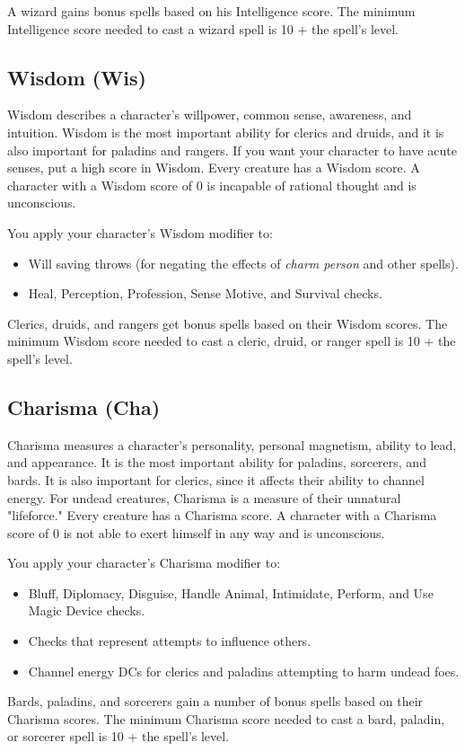A wizard gains bonus spells based on his Intelligence score. The minimum Intelligence score needed to cast a wizard spell is 10 + the spell's level. 
				
\subsection{Wisdom (Wis)}

				
Wisdom describes a character's willpower, common sense, awareness, and intuition. Wisdom is the most important ability for clerics and druids, and it is also important for paladins and rangers. If you want your character to have acute senses, put a high score in Wisdom. Every creature has a Wisdom score. A character with a Wisdom score of 0 is incapable of rational thought and is unconscious.
				
You apply your character's Wisdom modifier to:
				\begin{itemize}\item  Will saving throws (for negating the effects of \textit{charm person} and other spells).
				\item  Heal, Perception, Profession, Sense Motive, and Survival checks.
\end{itemize}
				
Clerics, druids, and rangers get bonus spells based on their Wisdom scores. The minimum Wisdom score needed to cast a cleric, druid, or ranger spell is 10 + the spell's level.
				
\subsection{Charisma (Cha)}

				
Charisma measures a character's personality, personal magnetism, ability to lead, and appearance. It is the most important ability for paladins, sorcerers, and bards. It is also important for clerics, since it affects their ability to channel energy. For undead creatures, Charisma is a measure of their unnatural "lifeforce." Every creature has a Charisma score. A character with a Charisma score of 0 is not able to exert himself in any way and is unconscious.
				
You apply your character's Charisma modifier to:
				\begin{itemize}\item  Bluff, Diplomacy, Disguise, Handle Animal, Intimidate, Perform, and Use Magic Device checks.
				\item  Checks that represent attempts to influence others. 
				\item  Channel energy DCs for clerics and paladins attempting to harm undead foes.
\end{itemize}
				
Bards, paladins, and sorcerers gain a number of bonus spells based on their Charisma scores. The minimum Charisma score needed to cast a bard, paladin, or sorcerer spell is 10 + the spell's level.
